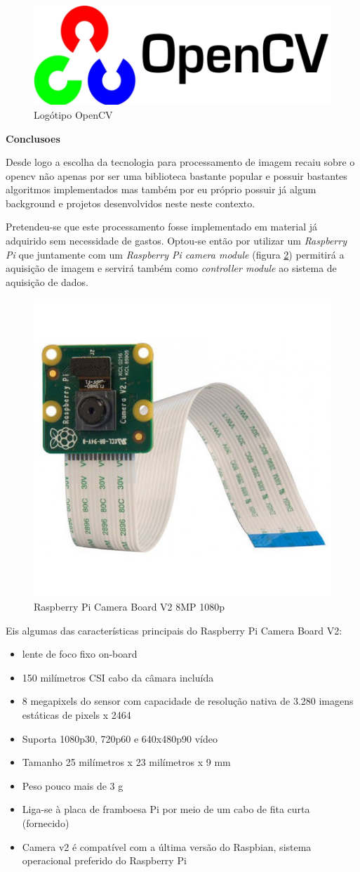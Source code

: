 \begin{figure}[!htb]
	\centering
	\includegraphics[width=0.5\linewidth]{img/vision/opencv_logo.jpg}
	\caption{Logótipo OpenCV}
	\label{opencvlogo}
\end{figure}


\textbf{Conclusoes} 

Desde logo a escolha da tecnologia para processamento de imagem recaiu sobre o opencv não apenas por ser uma biblioteca bastante popular e possuir bastantes algoritmos implementados mas também por eu próprio possuir já algum background e projetos desenvolvidos neste neste contexto.


Pretendeu-se que este processamento fosse implementado em material já adquirido sem necessidade de gastos. Optou-se então por utilizar um \textit{Raspberry Pi} que juntamente com um \textit{Raspberry Pi camera module} (figura \ref{raspicam}) permitirá a aquisição de imagem e servirá também como \textit{controller module} ao sistema de aquisição de dados. 


\begin{figure}[!htb]
	\centering
	\includegraphics[width=0.3\linewidth]{img/hardware/camera_v2.jpg}
	\caption{Raspberry Pi Camera Board V2 8MP 1080p}
	\label{raspicam}
\end{figure}


Eis algumas das características principais do Raspberry Pi Camera Board V2:

\begin{itemize}
	\item lente de foco fixo on-board
	\item 150 milímetros CSI cabo da câmara incluída
	\item 8 megapixels do sensor com capacidade de resolução nativa de 3.280 imagens estáticas de pixels x 2464
	\item Suporta 1080p30, 720p60 e 640x480p90 vídeo
	\item Tamanho 25 milímetros x 23 milímetros x 9 mm
	\item Peso pouco mais de 3 g
	\item Liga-se à placa de framboesa Pi por meio de um cabo de fita curta (fornecido)
	\item Camera v2 é compatível com a última versão do Raspbian, sistema operacional preferido do Raspberry Pi
\end{itemize}


